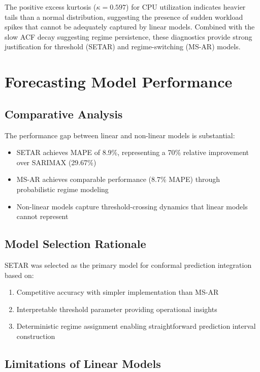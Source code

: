\documentclass[12pt]{report}
\begin{document}
The positive excess kurtosis ($\kappa = 0.597$) for CPU utilization indicates heavier tails than a normal distribution, suggesting the presence of sudden workload spikes that cannot be adequately captured by linear models. Combined with the slow ACF decay suggesting regime persistence, these diagnostics provide strong justification for threshold (SETAR) and regime-switching (MS-AR) models.

\section{Forecasting Model Performance}

\subsection{Comparative Analysis}

The performance gap between linear and non-linear models is substantial:

\begin{itemize}
    \item SETAR achieves MAPE of 8.9\%, representing a 70\% relative improvement over SARIMAX (29.67\%)
    \item MS-AR achieves comparable performance (8.7\% MAPE) through probabilistic regime modeling
    \item Non-linear models capture threshold-crossing dynamics that linear models cannot represent
\end{itemize}

\subsection{Model Selection Rationale}

SETAR was selected as the primary model for conformal prediction integration based on:

\begin{enumerate}
    \item Competitive accuracy with simpler implementation than MS-AR
    \item Interpretable threshold parameter providing operational insights
    \item Deterministic regime assignment enabling straightforward prediction interval construction
\end{enumerate}

\subsection{Limitations of Linear Models}
\end{document}
